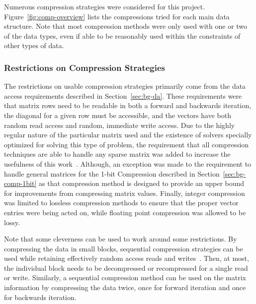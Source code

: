 Numerous compression strategies were considered for this project.
Figure~\ref{fig:comp-overview} lists the compressions tried for each main data structure.
Note that most compression methods were only used with one or two of the data types, even if able to be reasonably used within the constraints of other types of data.



\subsubsection{Restrictions on Compression Strategies}
The restrictions on usable compression strategies primarily come from the data access requirements described in Section~\ref{sec:bg-da}.
These requirements were that matrix rows need to be readable in both a forward and backwards iteration, the diagonal for a given row must be accessible, and the vectors have both random read access and random, immediate write access.
Due to the highly regular nature of the particular matrix used and the existence of solvers specially optimized for solving this type of problem, the requirement that all compression techniques are able to handle any sparse matrix was added to increase the usefulness of this work~\cite{Saad:2003:IterativeMethods}.
Although, an exception was made to the requirement to handle general matrices for the 1-bit Compression described in Section~\ref{sec:bg-comp-1bit} as that compression method is designed to provide an upper bound for improvements from compressing matrix values.
Finally, integer compression was limited to lossless compression methods to ensure that the proper vector entries were being acted on, while floating point compression was allowed to be lossy.

Note that some cleverness can be used to work around some restrictions.
By compressing the data in small blocks, sequential compression strategies can be used while retaining effectively random access reads and writes~\cite{Lindstrom:2014:zfp}.
Then, at most, the individual block needs to be decompressed or recompressed for a single read or write.
Similarly, a sequential compression method can be used on the matrix information by compressing the data twice, once for forward iteration and once for backwards iteration.



